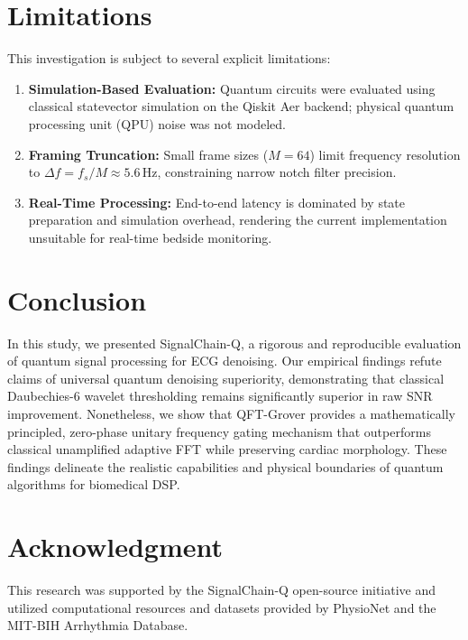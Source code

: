 \documentclass[journal,compsoc]{IEEEtran}
\begin{document}
\section{Limitations}
This investigation is subject to several explicit limitations:
\begin{enumerate}
    \item \textbf{Simulation-Based Evaluation:} Quantum circuits were evaluated using classical statevector simulation on the Qiskit Aer backend; physical quantum processing unit (QPU) noise was not modeled.
    \item \textbf{Framing Truncation:} Small frame sizes ($M=64$) limit frequency resolution to $\Delta f = f_s / M \approx 5.6$\,Hz, constraining narrow notch filter precision.
    \item \textbf{Real-Time Processing:} End-to-end latency is dominated by state preparation and simulation overhead, rendering the current implementation unsuitable for real-time bedside monitoring.
\end{enumerate}

\section{Conclusion}
In this study, we presented SignalChain-Q, a rigorous and reproducible evaluation of quantum signal processing for ECG denoising. Our empirical findings refute claims of universal quantum denoising superiority, demonstrating that classical Daubechies-6 wavelet thresholding remains significantly superior in raw SNR improvement. Nonetheless, we show that QFT-Grover provides a mathematically principled, zero-phase unitary frequency gating mechanism that outperforms classical unamplified adaptive FFT while preserving cardiac morphology. These findings delineate the realistic capabilities and physical boundaries of quantum algorithms for biomedical DSP.

\section*{Acknowledgment}
This research was supported by the SignalChain-Q open-source initiative and utilized computational resources and datasets provided by PhysioNet and the MIT-BIH Arrhythmia Database.



\end{document}
